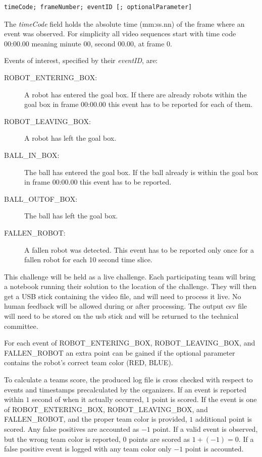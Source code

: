 \documentclass[12pt]{article}
\begin{document}
\begin{verbatim}
timeCode; frameNumber; eventID [; optionalParameter]	
\end{verbatim}

The \emph{timeCode} field holds the absolute time (mm:ss.nn) of the frame where an event was observed. For simplicity all video sequences start with time code 00:00.00 meaning minute 00, second 00.00, at frame $0$.

Events of interest, specified by their \emph{eventID}, are:

\begin{description}
	\item[ROBOT\_ENTERING\_BOX:] A robot has entered the goal box. If there are already robots within the goal box in frame 00:00.00 this event has to be reported for each of them.
	\item[ROBOT\_LEAVING\_BOX:] A robot has left the goal box. 
	\item[BALL\_IN\_BOX:] The ball has entered the goal box. If the ball already is within the goal box in frame 00:00.00 this event has to be reported.
	\item[BALL\_OUTOF\_BOX:] The ball has left the goal box.
	\item[FALLEN\_ROBOT:] A fallen robot was detected. This event has to be reported only once for a fallen robot for each 10 second time slice.
\end{description}

This challenge will be held as a live challenge.  Each participating team will bring a notebook running their solution to the location of the challenge.  They will then get a USB stick containing the video file, and will need to process it live.  No human feedback will be allowed during or after processing.  The output csv file will need to be stored on the usb stick and will be returned to the technical committee.

For each event of ROBOT\_ENTERING\_BOX, ROBOT\_LEAVING\_BOX, and FALLEN\_ROBOT an extra point can be gained if the optional parameter contains the robot's correct team color (RED, BLUE). 

To calculate a teams score, the produced log file is cross checked with respect to events and timestamps precalculated by the organizers. If an event is reported within $1$ second of when it actually occurred, $1$ point is scored. If the event is one of ROBOT\_ENTERING\_BOX, ROBOT\_LEAVING\_BOX, and FALLEN\_ROBOT, and the proper team color is provided, $1$ additional point is scored. Any false positives are accounted as $-1$ point. If a valid event is observed, but the wrong team color is reported, $0$ points are scored as $1+(-1)=0$. If a false positive event is logged with any team color only $-1$ point is accounted. 
\end{document}
